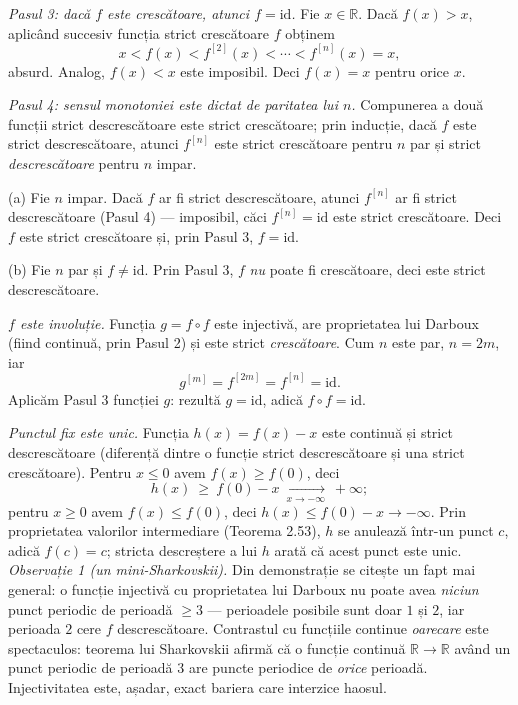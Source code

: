\emph{Pasul 3: dacă $f$ este crescătoare, atunci $f=\mathrm{id}$.} Fie $x\in\mathbb{R}$. Dacă $f(x)>x$, aplicând succesiv funcția strict crescătoare $f$ obținem
\[ x<f(x)<f^{[2]}(x)<\cdots<f^{[n]}(x)=x , \]
absurd. Analog, $f(x)<x$ este imposibil. Deci $f(x)=x$ pentru orice $x$.

\emph{Pasul 4: sensul monotoniei este dictat de paritatea lui $n$.} Compunerea a două funcții strict descrescătoare este strict crescătoare; prin inducție, dacă $f$ este strict descrescătoare, atunci $f^{[n]}$ este strict crescătoare pentru $n$ par și strict \emph{descrescătoare} pentru $n$ impar.

(a) Fie $n$ impar. Dacă $f$ ar fi strict descrescătoare, atunci $f^{[n]}$ ar fi strict descrescătoare (Pasul 4) --- imposibil, căci $f^{[n]}=\mathrm{id}$ este strict crescătoare. Deci $f$ este strict crescătoare și, prin Pasul 3, $f=\mathrm{id}$.

(b) Fie $n$ par și $f\neq\mathrm{id}$. Prin Pasul 3, $f$ \emph{nu} poate fi crescătoare, deci este strict descrescătoare.

\emph{$f$ este involuție.} Funcția $g=f\circ f$ este injectivă, are proprietatea lui Darboux (fiind continuă, prin Pasul 2) și este strict \emph{crescătoare}. Cum $n$ este par, $n=2m$, iar
\[ g^{[m]}=f^{[2m]}=f^{[n]}=\mathrm{id} . \]
Aplicăm Pasul 3 funcției $g$: rezultă $g=\mathrm{id}$, adică $f\circ f=\mathrm{id}$.

\emph{Punctul fix este unic.} Funcția $h(x)=f(x)-x$ este continuă și strict descrescătoare (diferență dintre o funcție strict descrescătoare și una strict crescătoare). Pentru $x\le0$ avem $f(x)\ge f(0)$, deci
\[ h(x)\ \ge\ f(0)-x\ \xrightarrow[x\to-\infty]{}\ +\infty ; \]
pentru $x\ge0$ avem $f(x)\le f(0)$, deci $h(x)\le f(0)-x\to-\infty$. Prin proprietatea valorilor intermediare (Teorema 2.53), $h$ se anulează într-un punct $c$, adică $f(c)=c$; stricta descreștere a lui $h$ arată că acest punct este unic.\\[2pt]
\emph{Observație 1 (un mini-Sharkovskii).} Din demonstrație se citește un fapt mai general: o funcție injectivă cu proprietatea lui Darboux nu poate avea \emph{niciun} punct periodic de perioadă $\ge3$ --- perioadele posibile sunt doar $1$ și $2$, iar perioada $2$ cere $f$ descrescătoare. Contrastul cu funcțiile continue \emph{oarecare} este spectaculos: teorema lui Sharkovskii afirmă că o funcție continuă $\mathbb{R}\to\mathbb{R}$ având un punct periodic de perioadă $3$ are puncte periodice de \emph{orice} perioadă. Injectivitatea este, așadar, exact bariera care interzice haosul.

